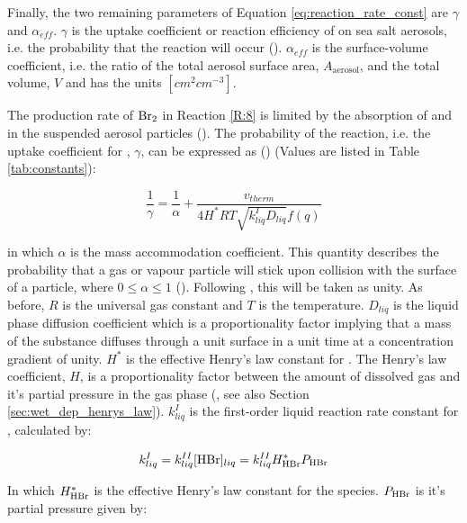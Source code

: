 \medskip

Finally, the two remaining parameters of Equation \ref{eq:reaction_rate_const} are $\gamma$ and $\alpha_{eff}$. $\gamma$ is the uptake coefficient or reaction efficiency of  on sea salt aerosols, i.e. the probability that the reaction will occur (\cite{SeinfeldSpyros}). $\alpha_{eff}$ is the surface-volume coefficient, i.e. the ratio of the total aerosol surface area, $A_{\text{aerosol}}$, and the total volume, $V$ and has the units $[cm^2cm^{-3}]$.
 
\medskip

The production rate of $\mathrm{Br_2}$ in Reaction \ref{R:8} is limited by the absorption of  and  in the suspended aerosol particles (\cite{CAO}). The probability of the reaction, i.e. the uptake coefficient for , $\gamma$,  can be expressed as (\cite{Hanson1994}) (Values are listed in Table \ref{tab:constants}): 

\begin{equation}
    \frac{1}{\gamma} = \frac{1}{\alpha}+ \frac{v_{therm}}{4H^*RT\sqrt{k_{liq}^ID_{liq}}f(q)}
    \label{eq:upt_coeff}
\end{equation}

in which $\alpha$ is the mass accommodation coefficient. This quantity describes the probability that a gas or vapour particle will stick upon collision with the surface of a particle, where $0\leq\alpha\leq1$ (\cite{SeinfeldSpyros}). Following \cite{CAO}, this will be taken as unity. As before, $R$ is the universal gas constant and $T$ is the temperature. $D_{liq}$ is the liquid phase diffusion coefficient which is a proportionality factor implying that a mass of the substance diffuses through a unit surface in a unit time at a concentration gradient of unity. $H^*$ is the effective Henry's law constant for . The Henry's law coefficient, $H$, is a proportionality factor between the amount of dissolved gas and it's partial pressure in the gas phase (\cite{Sander2015}, see also Section \ref{sec:wet_dep_henrys_law}). $k_{liq}^I$ is the first-order liquid reaction rate constant for , calculated by: 

\begin{equation}
    k_{liq}^I = k_{liq}^{II}[\mathrm{HBr}]_{liq}= k_{liq}^{II}H^*_{\mathrm{HBr}}P_{\mathrm{HBr}}
\end{equation}

In which $H^*_{\mathrm{HBr}}$ is the effective Henry's law constant for the species. $P_{\mathrm{HBr}}$ is it's partial pressure given by:

